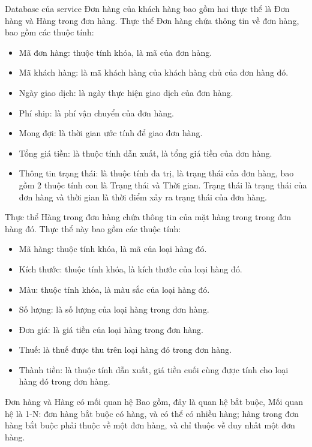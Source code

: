 \par Database của service Đơn hàng của khách hàng bao gồm hai thực thể là Đơn hàng và Hàng trong đơn hàng. Thực thể Đơn hàng chứa thông tin về đơn hàng, bao gồm các thuộc tính:
\begin{itemize}
    \item Mã đơn hàng: thuộc tính khóa, là mã của đơn hàng.
    \item Mã khách hàng: là mã khách hàng của khách hàng chủ của đơn hàng đó.
    \item Ngày giao dịch: là ngày thực hiện giao dịch của đơn hàng.
    \item Phí ship: là phí vận chuyển của đơn hàng.
    \item Mong đợi: là thời gian ước tính để giao đơn hàng.
    \item Tổng giá tiền: là thuộc tính dẫn xuất, là tổng giá tiền của đơn hàng.
    \item Thông tin trạng thái: là thuộc tính đa trị, là trạng thái của đơn hàng, bao gồm 2 thuộc tính con là Trạng thái và Thời gian. Trạng thái là trạng thái của đơn hàng và thời gian là thời điểm xảy ra trạng thái của đơn hàng.
\end{itemize}

\par Thực thể Hàng trong đơn hàng chứa thông tin của mặt hàng trong trong đơn hàng đó. Thực thể này bao gồm các thuộc tính:
\begin{itemize}
    \item Mã hàng: thuộc tính khóa, là mã của loại hàng đó.
    \item Kích thước: thuộc tính khóa, là kích thước của loại hàng đó.
    \item Màu: thuộc tính khóa, là màu sắc của loại hàng đó.
    \item Số lượng: là số lượng của loại hàng trong đơn hàng.
    \item Đơn giá: là giá tiền của loại hàng trong đơn hàng.
    \item Thuế: là thuế được thu trên loại hàng đó trong đơn hàng.
    \item Thành tiền: là thuộc tính dẫn xuất, giá tiền cuối cùng được tính cho loại hàng đó trong đơn hàng.
\end{itemize}

\par Đơn hàng và Hàng có mối quan hệ Bao gồm, đây là quan hệ bắt buộc, Mối quan hệ là 1-N: đơn hàng bắt buộc có hàng, và có thể có nhiều hàng; hàng trong đơn hàng bắt buộc phải thuộc về một đơn hàng, và chỉ thuộc về duy nhất một đơn hàng.

